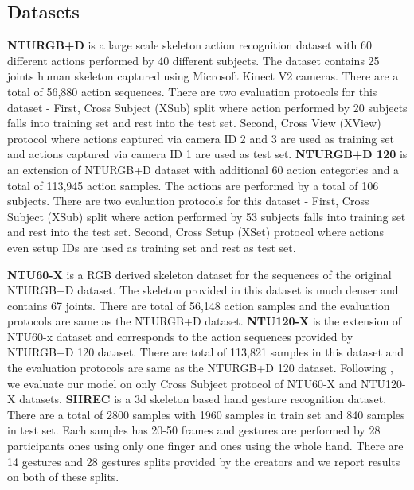 \documentclass[runningheads]{llncs}
\begin{document}
\subsection{Datasets}
\label{sec:datasets}

\textbf{NTURGB+D\cite{Shahroudy_2016_CVPR}} is a large scale skeleton action recognition dataset with 60 different actions performed by 40 different subjects. The dataset contains 25 joints human skeleton captured using Microsoft Kinect V2 cameras. There are a total of 56,880 action sequences. There are two evaluation protocols for this dataset - First, Cross Subject (XSub) split where action performed by 20 subjects falls into training set and rest into the test set. Second, Cross View (XView) protocol where actions captured via camera ID 2 and 3 are used as training set and actions captured via camera ID 1 are used as test set.
\newline
\textbf{NTURGB+D 120\cite{Liu_2019_NTURGBD120}} is an extension of NTURGB+D dataset with additional 60 action categories and a total of 113,945 action samples. The actions are performed by a total of 106 subjects. There are two evaluation protocols for this dataset - First, Cross Subject (XSub) split where action performed by 53 subjects falls into training set and rest into the test set. Second, Cross Setup (XSet) protocol where actions even setup IDs are used as training set and rest as test set.

\noindent\textbf{NTU60-X\cite{trivedi2021ntux}} is a RGB derived skeleton dataset for the sequences of the original NTURGB+D dataset. The skeleton provided in this dataset is much denser and contains 67 joints. There are total of 56,148 action samples and the evaluation protocols are same as the NTURGB+D dataset.
\newline
\noindent\textbf{NTU120-X\cite{trivedi2021ntux}} is the extension of NTU60-x dataset and corresponds to the action sequences provided by NTURGB+D 120 dataset. There are total of 113,821 samples in this dataset and the evaluation protocols are same as the NTURGB+D 120 dataset. Following \cite{trivedi2021ntux}, we evaluate our model on only Cross Subject protocol of NTU60-X and NTU120-X datasets.
\newline
\noindent\textbf{SHREC\cite{de20173d}} is a 3d skeleton based hand gesture recognition dataset. There are a total of 2800 samples with 1960 samples in train set and 840 samples in test set. Each samples has 20-50 frames and gestures are performed by 28 participants ones using only one finger and ones using the whole hand. There are 14 gestures and 28 gestures splits provided by the creators and we report results on both of these splits.
\end{document}

